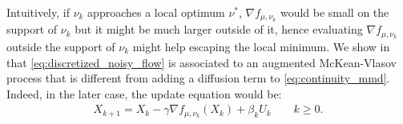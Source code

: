 Intuitively, if $\nu_k$ approaches a local optimum $\nu^{*}$, $ \nabla f_{\mu,\nu_k}$ would be small on the support of $\nu_k$ but it might be much larger outside of it, hence evaluating $\nabla f_{\mu,\nu_k}$ outside the support of $\nu_k$ might help escaping the local minimum. We show in  that \cref{eq:discretized_noisy_flow} is associated to an augmented McKean-Vlasov process that is different from adding a diffusion term to \cref{eq:continuity_mmd}. Indeed, in the later case, the update equation would be:
\begin{align}\label{eq:diffusion}
	X_{k+1} = X_{k} -\gamma \nabla f_{\mu,\nu_k}(X_k)+ \beta_k U_k \qquad k\geq 0.
\end{align}
